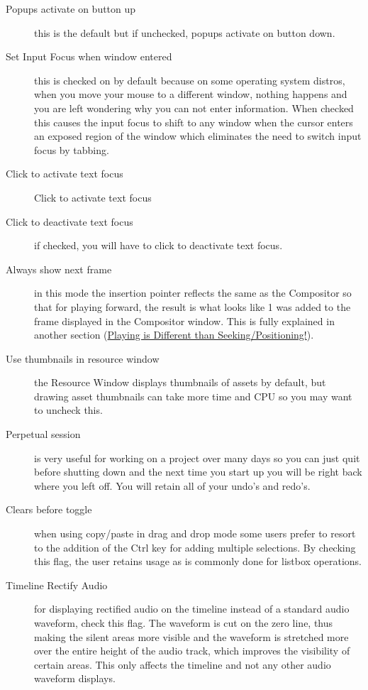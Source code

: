 \begin{description}
    \item[Popups activate on button up] this is the default but if unchecked, popups activate on button down.
    \item[Set Input Focus when window entered] this is checked on by default because on some operating system distros, when you move your mouse to a different window, nothing happens and you are left wondering why you can not enter information.  When checked this causes the input focus to shift to any \CGG{} window when the cursor enters an exposed region of the window which eliminates the need to switch input focus by tabbing. 
    \item[Click to activate text focus] Click to activate text focus
    \item [Click to deactivate text focus] if checked, you will have to click to deactivate text focus.
    \item[Always show next frame] in this mode the insertion pointer reflects the same as the Compositor so that for playing forward, the result is what looks like 1 was added to the frame displayed in the Compositor window.  This is fully explained in another section (\hyperref[sub:playing_seeking]{Playing is Different than Seeking/Positioning!}).
    \item[Use thumbnails in resource window] the Resource Window displays thumbnails of assets by default, but drawing asset thumbnails can take more time and CPU so you may want to uncheck this.
    \item[Perpetual session] is very useful for working on a project over many days so you can just quit before
    shutting down and the next time you start up \CGG{} you will be right back where you left off. You
    will retain all of your undo's and redo's.
    \item[Clears before toggle] when using copy/paste in drag and drop mode some users prefer to resort to the addition of the Ctrl key for adding multiple selections.  By checking this flag, the user retains usage as is commonly done for listbox operations.
    \item[Timeline Rectify Audio] for displaying rectified audio on the timeline instead of a standard audio waveform, check this flag.  The waveform is cut on the zero line, thus making the silent areas more visible and the waveform is stretched more over the entire height of the audio track, which improves the visibility of certain areas. This only affects the timeline and not any other audio waveform displays.
\end{description}


